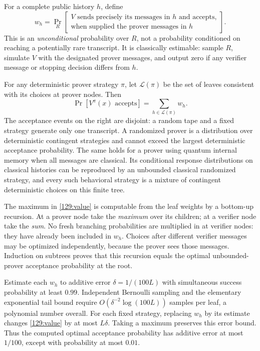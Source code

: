 \documentclass[11pt,a4paper]{article}
\numberwithin{equation}{section}
\begin{document}
For a complete public history $h$, define
\begin{equation}\label{129:leafweight}
 w_h=\Pr_R\left[\begin{gathered}
  V\text{ sends precisely its messages in }h\text{ and accepts,}\\
  \text{when supplied the prover messages in }h
 \end{gathered}\right].
\end{equation}
This is an \emph{unconditional} probability over $R$, not a probability
conditioned on reaching a potentially rare transcript.  It is
classically estimable: sample $R$, simulate $V$ with the designated
prover messages, and output zero if any verifier message or stopping
decision differs from $h$.

For any deterministic prover strategy $\pi$, let $\mathcal L(\pi)$ be
the set of leaves consistent with its choices at prover nodes.  Then
\begin{equation}\label{129:value}
 \Pr[V^\pi(x)\text{ accepts}]=\sum_{h\in\mathcal L(\pi)}w_h.
\end{equation}
The acceptance events on the right are disjoint: a random tape and a
fixed strategy generate only one transcript.  A randomized prover is
a distribution over deterministic contingent strategies and cannot
exceed the largest deterministic acceptance probability.  The same
holds for a prover using quantum internal memory when all messages
are classical.  Its conditional response distributions on classical
histories can be reproduced by an unbounded classical randomized
strategy, and every such behavioral strategy is a mixture of
contingent deterministic choices on this finite tree.

The maximum in \eqref{129:value} is computable from the leaf weights by
a bottom-up recursion.  At a prover node take the \emph{maximum} over
its children; at a verifier node take the \emph{sum}.  No fresh branching
probabilities are multiplied in at verifier nodes: they have already
been included in $w_h$.  Choices after different verifier messages may
be optimized independently, because the prover sees those messages.
Induction on subtrees proves that this recursion equals the optimal
unbounded-prover acceptance probability at the root.

Estimate each $w_h$ to additive error
$\delta=1/(100L)$ with simultaneous success probability at least $0.99$.
Independent Bernoulli sampling and the elementary exponential tail
bound require $O(\delta^{-2}\log(100L))$ samples per leaf, a polynomial
number overall.  For each fixed strategy, replacing $w_h$ by its estimate
changes \eqref{129:value} by at most $L\delta$.  Taking a maximum
preserves this error bound.  Thus the computed optimal acceptance
probability has additive error at most $1/100$, except with probability
at most $0.01$.
\end{document}
